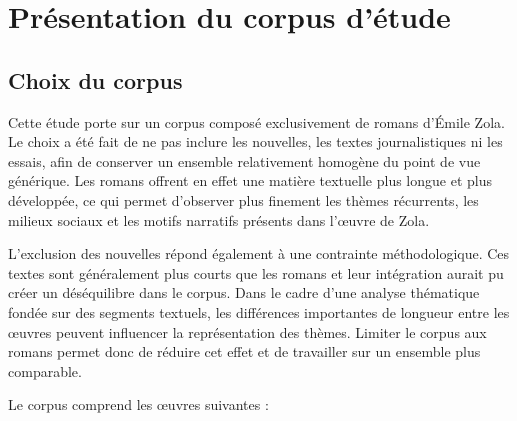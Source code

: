 \section{Présentation du corpus d'étude}

\subsection{Choix du corpus}
Cette étude porte sur un corpus composé exclusivement de romans d'Émile Zola. Le choix a été fait de ne pas inclure les nouvelles, les textes journalistiques ni les essais, afin de conserver un ensemble relativement homogène du point de vue générique. Les romans offrent en effet une matière textuelle plus longue et plus développée, ce qui permet d'observer plus finement les thèmes récurrents, les milieux sociaux et les motifs narratifs présents dans l'œuvre de Zola.

L'exclusion des nouvelles répond également à une contrainte méthodologique. Ces textes sont généralement plus courts que les romans et leur intégration aurait pu créer un déséquilibre dans le corpus. Dans le cadre d'une analyse thématique fondée sur des segments textuels, les différences importantes de longueur entre les œuvres peuvent influencer la représentation des thèmes. Limiter le corpus aux romans permet donc de réduire cet effet et de travailler sur un ensemble plus comparable.

Le corpus comprend les œuvres suivantes :

